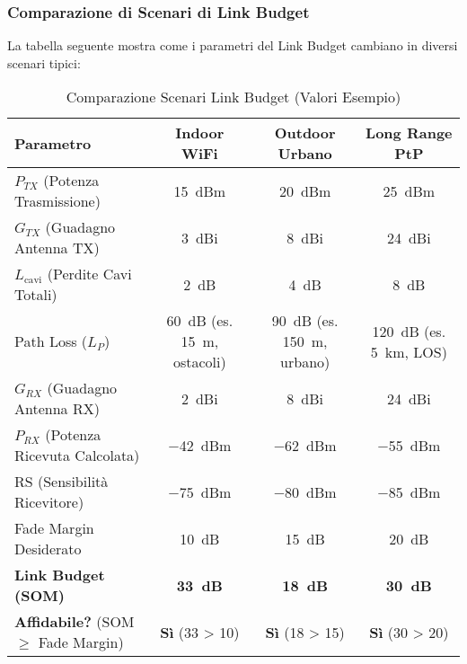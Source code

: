 \begin{center}
\end{center}

\subsubsection{Comparazione di Scenari di Link Budget}
La tabella seguente mostra come i parametri del Link Budget cambiano in diversi scenari tipici:

\begin{table}[H]
\centering
\caption{Comparazione Scenari Link Budget (Valori Esempio)}
\begin{tabular}{|l|c|c|c|}
\hline
\textbf{Parametro} & \textbf{Indoor WiFi} & \textbf{Outdoor Urbano} & \textbf{Long Range PtP} \\
\hline
$P_{TX}$ (Potenza Trasmissione) & \SI{15}{dBm} & \SI{20}{dBm} & \SI{25}{dBm} \\
$G_{TX}$ (Guadagno Antenna TX) & \SI{3}{dBi} & \SI{8}{dBi} & \SI{24}{dBi} \\
$L_{\text{cavi}}$ (Perdite Cavi Totali) & \SI{2}{dB} & \SI{4}{dB} & \SI{8}{dB} \\
Path Loss ($L_P$) & \SI{60}{dB} (es. \SI{15}{m}, ostacoli) & \SI{90}{dB} (es. \SI{150}{m}, urbano) & \SI{120}{dB} (es. \SI{5}{km}, LOS) \\
$G_{RX}$ (Guadagno Antenna RX) & \SI{2}{dBi} & \SI{8}{dBi} & \SI{24}{dBi} \\
\hline
$P_{RX}$ (Potenza Ricevuta Calcolata) & \SI{-42}{dBm} & \SI{-62}{dBm} & \SI{-55}{dBm} \\
\hline
RS (Sensibilità Ricevitore) & \SI{-75}{dBm} & \SI{-80}{dBm} & \SI{-85}{dBm} \\
Fade Margin Desiderato & \SI{10}{dB} & \SI{15}{dB} & \SI{20}{dB} \\
\hline
\textbf{Link Budget (SOM)} & \textbf{\SI{33}{dB}} & \textbf{\SI{18}{dB}} & \textbf{\SI{30}{dB}} \\
\textbf{Affidabile?} (SOM $\ge$ Fade Margin) & \textbf{Sì} (33 > 10) & \textbf{Sì} (18 > 15) & \textbf{Sì} (30 > 20) \\
\hline
\end{tabular}
\label{tab:link_budget_scenarios} %
\end{table}

